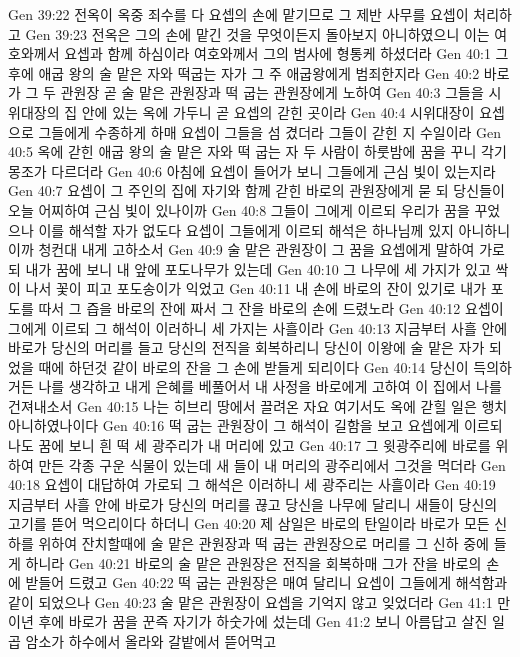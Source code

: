 Gen 39:22  전옥이 옥중 죄수를 다 요셉의 손에 맡기므로 그 제반 사무를 요셉이 처리하고
Gen 39:23  전옥은 그의 손에 맡긴 것을 무엇이든지 돌아보지 아니하였으니 이는 여호와께서 요셉과 함께 하심이라 여호와께서 그의 범사에 형통케 하셨더라
Gen 40:1  그 후에 애굽 왕의 술 맡은 자와 떡굽는 자가 그 주 애굽왕에게 범죄한지라
Gen 40:2  바로가 그 두 관원장 곧 술 맡은 관원장과 떡 굽는 관원장에게 노하여
Gen 40:3  그들을 시위대장의 집 안에 있는 옥에 가두니 곧 요셉의 갇힌 곳이라
Gen 40:4  시위대장이 요셉으로 그들에게 수종하게 하매 요셉이 그들을 섬 겼더라 그들이 갇힌 지 수일이라
Gen 40:5  옥에 갇힌 애굽 왕의 술 맡은 자와 떡 굽는 자 두 사람이 하룻밤에 꿈을 꾸니 각기 몽조가 다르더라
Gen 40:6  아침에 요셉이 들어가 보니 그들에게 근심 빛이 있는지라
Gen 40:7  요셉이 그 주인의 집에 자기와 함께 갇힌 바로의 관원장에게 묻 되 당신들이 오늘 어찌하여 근심 빛이 있나이까
Gen 40:8  그들이 그에게 이르되 우리가 꿈을 꾸었으나 이를 해석할 자가 없도다 요셉이 그들에게 이르되 해석은 하나님께 있지 아니하니 이까 청컨대 내게 고하소서
Gen 40:9  술 맡은 관원장이 그 꿈을 요셉에게 말하여 가로되 내가 꿈에 보니 내 앞에 포도나무가 있는데
Gen 40:10  그 나무에 세 가지가 있고 싹이 나서 꽃이 피고 포도송이가 익었고
Gen 40:11  내 손에 바로의 잔이 있기로 내가 포도를 따서 그 즙을 바로의 잔에 짜서 그 잔을 바로의 손에 드렸노라
Gen 40:12  요셉이 그에게 이르되 그 해석이 이러하니 세 가지는 사흘이라
Gen 40:13  지금부터 사흘 안에 바로가 당신의 머리를 들고 당신의 전직을 회복하리니 당신이 이왕에 술 맡은 자가 되었을 때에 하던것 같이 바로의 잔을 그 손에 받들게 되리이다
Gen 40:14  당신이 득의하거든 나를 생각하고 내게 은혜를 베풀어서 내 사정을 바로에게 고하여 이 집에서 나를 건져내소서
Gen 40:15  나는 히브리 땅에서 끌려온 자요 여기서도 옥에 갇힐 일은 행치 아니하였나이다
Gen 40:16  떡 굽는 관원장이 그 해석이 길함을 보고 요셉에게 이르되 나도 꿈에 보니 흰 떡 세 광주리가 내 머리에 있고
Gen 40:17  그 윗광주리에 바로를 위하여 만든 각종 구운 식물이 있는데 새 들이 내 머리의 광주리에서 그것을 먹더라
Gen 40:18  요셉이 대답하여 가로되 그 해석은 이러하니 세 광주리는 사흘이라
Gen 40:19  지금부터 사흘 안에 바로가 당신의 머리를 끊고 당신을 나무에 달리니 새들이 당신의 고기를 뜯어 먹으리이다 하더니
Gen 40:20  제 삼일은 바로의 탄일이라 바로가 모든 신하를 위하여 잔치할때에 술 맡은 관원장과 떡 굽는 관원장으로 머리를 그 신하 중에 들게 하니라
Gen 40:21  바로의 술 맡은 관원장은 전직을 회복하매 그가 잔을 바로의 손 에 받들어 드렸고
Gen 40:22  떡 굽는 관원장은 매여 달리니 요셉이 그들에게 해석함과 같이 되었으나
Gen 40:23  술 맡은 관원장이 요셉을 기억지 않고 잊었더라
Gen 41:1  만 이년 후에 바로가 꿈을 꾼즉 자기가 하숫가에 섰는데
Gen 41:2  보니 아름답고 살진 일곱 암소가 하수에서 올라와 갈밭에서 뜯어먹고
